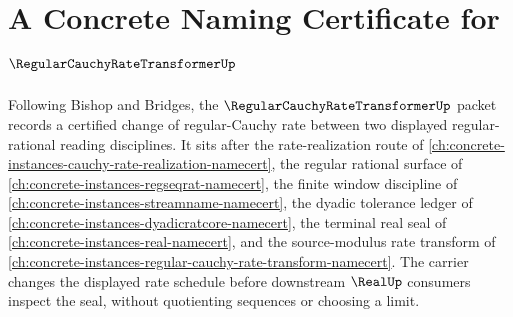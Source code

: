 \chapter{A Concrete Naming Certificate for $\RegularCauchyRateTransformerUp$}
\label{ch:concrete-instances-regular-cauchy-rate-transformer-namecert}

Following Bishop and Bridges, the $\RegularCauchyRateTransformerUp$ packet records a certified change of regular-Cauchy rate between two displayed regular-rational reading disciplines. It sits after the rate-realization route of \autoref{ch:concrete-instances-cauchy-rate-realization-namecert}, the regular rational surface of \autoref{ch:concrete-instances-regseqrat-namecert}, the finite window discipline of \autoref{ch:concrete-instances-streamname-namecert}, the dyadic tolerance ledger of \autoref{ch:concrete-instances-dyadicratcore-namecert}, the terminal real seal of \autoref{ch:concrete-instances-real-namecert}, and the source-modulus rate transform of \autoref{ch:concrete-instances-regular-cauchy-rate-transform-namecert}. The carrier changes the displayed rate schedule before downstream $\RealUp$ consumers inspect the seal, without quotienting sequences or choosing a limit.

